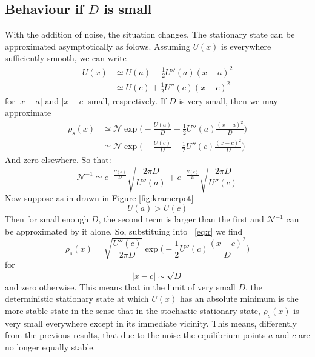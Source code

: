 \subsection{Behaviour if $D$ is small}
With the addition of noise, the situation changes. The stationary state can be approximated asymptotically as folows. Assuming $U(x)$ is everywhere sufficiently smooth, we can write
\begin{equation}
\begin{split}
U(x) & \simeq U(a) + \frac{1}{2} U''(a)(x-a)^2 \\
& \simeq U(c) + \frac{1}{2} U''(c)(x-c)^2 
\end{split}
\end{equation}
for $|x-a|$ and $|x-c|$ small, respectively.
If $D$ is very small, then we may approximate
\begin{equation}
\begin{split}
\rho_s(x)  &\simeq \mathcal{N} \exp\biggl(-\frac{U(a)}{D} - \frac{1}{2} U''(a)\frac{(x-a)^2}{D}\biggr) \\
&\simeq \mathcal{N} \exp\biggl(-\frac{U(c)}{D} - \frac{1}{2} U''(c)\frac{(x-c)^2}{D}\biggr) 
\end{split}
\label{eq:r}
\end{equation}
And zero elsewhere.
So that:
\begin{equation}
\mathcal{N}^{-1}  \simeq e^{-\frac{U(a)}{D}} \sqrt{\frac{ 2 \pi D }{U''(a)}} + e^{-\frac{U(c)}{D}} \sqrt{\frac{ 2 \pi D }{U''(c)}}
\end{equation}
Now suppose as in drawn in Figure \ref{fig:kramerpot} 
$$
U(a)>U(c)
$$
Then for small enough $D$, the second term is larger than the first and $\mathcal{N}^{-1}$ can be approximated by it alone. So, substituing into ~\ref{eq:r} we find
\begin{equation}
\rho_s(x) = \sqrt{\frac{U''(c)}{2 \pi D}} \exp\biggl(-\frac{1}{2}U''(c)\frac{(x-c)^2}{D}\biggr)
\end{equation}
for 
$$
|x-c| \sim \sqrt{D}
$$
and zero otherwise.
This means that in the limit of very small $D$, the deterministic stationary state at which $U(x)$ has an absolute minimum is the more stable state in the sense that in the stochastic stationary state, $\rho_s(x)$ is very small everywhere except in its immediate vicinity. This means, differently from the previous results, that due to the noise the  equilibrium points $a$ and $c$ are no longer equally stable.














